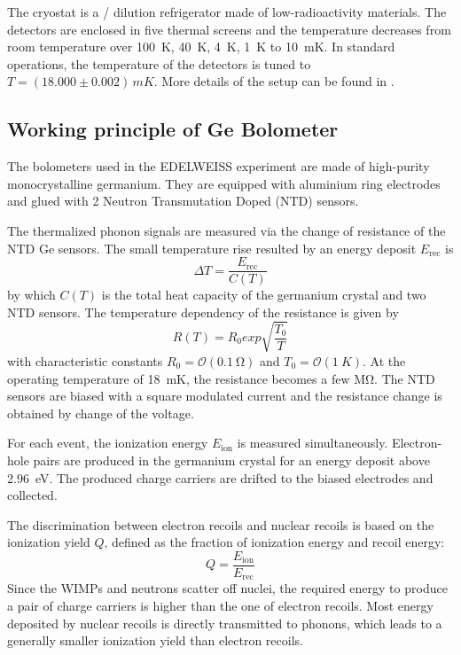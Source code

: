   The cryostat is a / dilution refrigerator made of low-radioactivity materials. The detectors are enclosed in five thermal screens and the temperature decreases from room temperature over \SI{100}{K}, \SI{40}{K}, \SI{4}{K}, \SI{1}{K} to \SI{10}{mK}. In standard operations, the temperature of the detectors is tuned to $T=(18.000 \pm 0.002)\,\si{mK}$. More details of the setup can be found in \cite{Arm17}.

\subsection{Working principle of Ge Bolometer}
  \label{edw-ge}
  The bolometers used in the EDELWEISS experiment are made of high-purity monocrystalline germanium. They are equipped with aluminium ring electrodes and glued with 2 Neutron Transmutation Doped (NTD) sensors.

  The thermalized phonon signals are measured via the change of resistance of the NTD Ge sensors. The small temperature rise resulted by an energy deposit $E_{\mathrm{rec}}$ is
  \begin{equation}
      \Delta T = \frac{E_{\mathrm{rec}}}{C(T)}
  \end{equation}
  by which $C(T)$ is the total heat capacity of the germanium crystal and two NTD sensors. The temperature dependency of the resistance is given by
  \begin{equation}
    R(T)=R_{0}exp\sqrt{\frac{T_{0}}{T}}
  \end{equation}
  with characteristic constants $R_{0}=\mathcal{O}(\SI{0.1}{\ohm})$ and $T_{0}=\mathcal{O}(\SI{1}{K})$. At the operating temperature of \SI{18}{mK}, the resistance becomes a few \si{\mega\ohm}. The NTD sensors are biased with a square modulated current and the resistance change is obtained by change of the voltage.%

  For each event, the ionization energy $E_{\mathrm{ion}}$ is measured simultaneously. Electron-hole pairs are produced in the germanium crystal for an energy deposit above \SI{2.96}{eV}. The produced charge carriers are drifted to the biased electrodes and collected.

  The discrimination between electron recoils and nuclear recoils is based on the ionization yield $Q$, defined as the fraction of ionization energy and recoil energy:
  \begin{equation}
    Q=\frac{E_{\mathrm{ion}}}{E_{\mathrm{rec}}}
  \end{equation}
  Since the WIMPs and neutrons scatter off nuclei, the required energy to produce a pair of charge carriers is higher than the one of electron recoils. Most energy deposited by nuclear recoils is directly transmitted to phonons, which leads to a generally smaller ionization yield than electron recoils.

